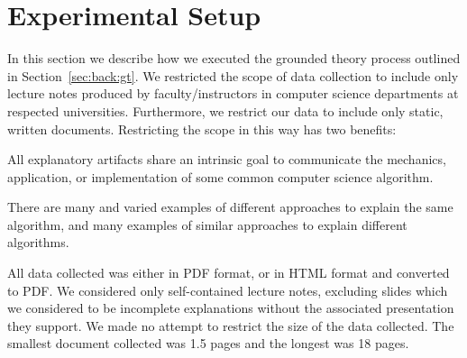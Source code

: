 \documentclass[sigconf]{acmart}
\begin{document}
%


\section{Experimental Setup}
\label{sec:exp:setup}

In this section we describe how we executed the grounded theory process
outlined in Section~\ref{sec:back:gt}.
%
We restricted the scope of data collection to include only lecture notes
produced by faculty/instructors in computer science departments at respected
universities. Furthermore, we restrict our data to include only static, written
documents. Restricting the scope in this way has two benefits:
%
\begin{enumerate*}
%
\item All explanatory artifacts share an intrinsic goal to communicate the
mechanics, application, or implementation of some common computer science
algorithm.
%
\item There are many and varied examples of different approaches to explain the
same algorithm, and many examples of similar approaches to explain different
algorithms.
%
%
  
\end{enumerate*}
%
All data collected was either in PDF format, or in HTML format and converted to
PDF. We considered only self-contained lecture notes, excluding slides which we
considered to be incomplete explanations without the associated presentation
they support. 
%
We made no attempt to restrict the size of the data collected. The smallest
document collected was 1.5 pages and the longest was 18 pages.
\end{document}
